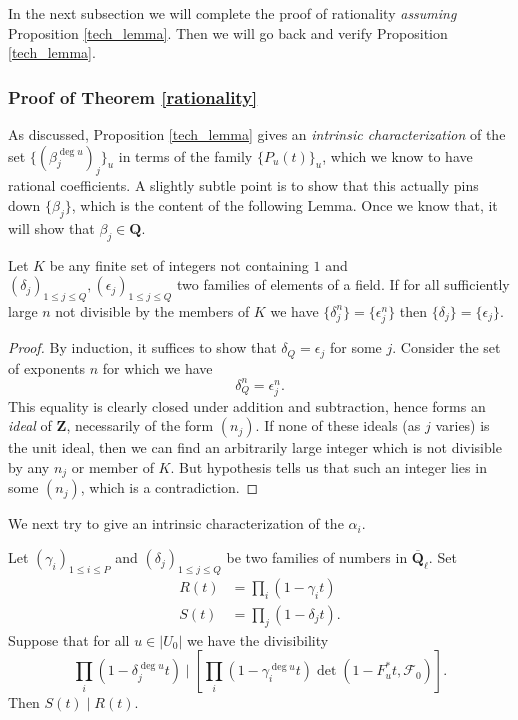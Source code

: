 \documentclass[letterpaper,11pt]{article}
\newcommand{\Q}{\mathbf{Q}}
\newcommand{\Z}{\mathbf{Z}}
\newcommand{\ol}[1]{\overline{#1}}
\newcommand{\Cal}[1]{\mathcal{#1}}
\begin{document}
In the next subsection we will complete the proof of rationality \emph{assuming} Proposition \ref{tech_lemma}. Then we will go back and verify Proposition \ref{tech_lemma}.

\subsubsection{Proof of Theorem \ref{rationality}}

As discussed, Proposition \ref{tech_lemma} gives an \emph{intrinsic characterization} of the set $\{(\beta_j^{\deg u})_j\}_u$ in terms of the family $\{P_u(t)\}_u$, which we know to have rational coefficients. A slightly subtle point is to show that this actually pins down $\{\beta_j\}$, which is the content of the following Lemma. Once we know that, it will show that $\beta_j \in \Q$. 


\begin{lemma}
Let $K$ be any finite set of integers not containing $1$ and $(\delta_j)_{1 \leq j \leq Q}, (\epsilon_j)_{1 \leq j \leq Q}$ two families of elements of a field. If for all sufficiently large $n$ not divisible by the members of $K$ we have $\{\delta_j^n\} = \{\epsilon_j^n\}$ then $\{\delta_j \} = \{\epsilon_j\}$. 
\end{lemma}


\begin{proof}
By induction, it suffices to show that $\delta_Q = \epsilon_j$ for some $j$. Consider the set of exponents $n$ for which we have 
\[
\delta_Q^n = \epsilon_j^n.
\]
This equality is clearly closed under addition and subtraction, hence forms an \emph{ideal} of $\Z$, necessarily of the form $(n_j)$. If none of these ideals (as $j$ varies) is the unit ideal, then we can find an arbitrarily large integer which is not divisible by any $n_j$ or member of $K$. But hypothesis tells us that such an integer lies in some $(n_j)$, which is a contradiction. 
\end{proof}


We next try to give an intrinsic characterization of the $\alpha_i$. 


\begin{prop}\label{num_recognition}
Let $(\gamma_i)_{1 \leq i \leq P}$ and $(\delta_j)_{1 \leq j \leq Q}$ be two families of numbers in $\ol{\Q}_{\ell}$. Set 
\begin{align*}
R(t) & = \prod_i (1-\gamma_i t)\\
S(t) & = \prod_j (1-\delta_j t).
\end{align*}
Suppose that for all $u \in |U_0|$ we have the divisibility 
\[
\prod_i (1-\delta_j^{\deg u} t)  \mid \left[ \prod_i (1-\gamma_i^{\deg u} t) \det (1-F_u^* t, \Cal{F}_0) \right].
\]
Then $S(t) \mid R(t)$. 
\end{prop}
\end{document}
